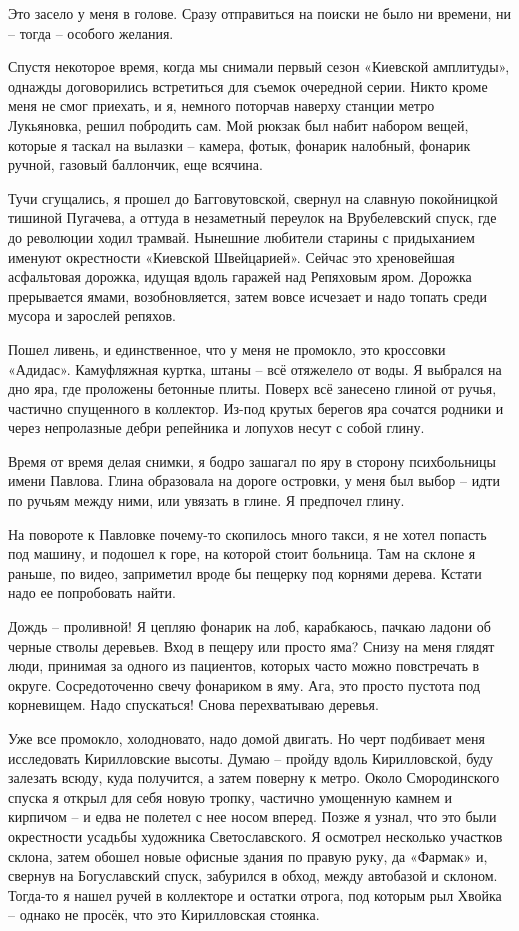Это засело у меня в голове. Сразу отправиться на поиски не было ни времени, ни – тогда – особого желания.

Спустя некоторое время, когда мы снимали первый сезон «Киевской амплитуды», однажды договорились встретиться для съемок очередной серии. Никто кроме меня не смог приехать, и я, немного поторчав наверху станции метро Лукьяновка, решил побродить сам. Мой рюкзак был набит набором вещей, которые я таскал на вылазки – камера, фотык, фонарик налобный, фонарик ручной, газовый баллончик, еще всячина.

Тучи сгущались, я прошел до Багговутовской, свернул на славную покойницкой тишиной Пугачева, а оттуда в незаметный переулок на Врубелевский спуск, где до революции ходил трамвай. Нынешние любители старины с придыханием именуют окрестности «Киевской Швейцарией». Сейчас это хреновейшая асфальтовая дорожка, идущая вдоль гаражей над Репяховым яром. Дорожка прерывается ямами, возобновляется, затем вовсе исчезает и надо топать среди мусора и зарослей репяхов.

Пошел ливень, и единственное, что у меня не промокло, это кроссовки «Адидас». Камуфляжная куртка, штаны – всё отяжелело от воды. Я выбрался на дно яра, где проложены бетонные плиты. Поверх всё занесено глиной от ручья, частично спущенного в коллектор. Из-под крутых берегов яра сочатся родники и через непролазные дебри репейника и лопухов несут с собой глину.

Время от время делая снимки, я бодро зашагал по яру в сторону психбольницы имени Павлова. Глина образовала на дороге островки, у меня был выбор – идти по ручьям между ними, или увязать в глине. Я предпочел глину.

На повороте к Павловке почему-то скопилось много такси, я не хотел попасть под машину, и подошел к горе, на которой стоит больница. Там на склоне я раньше, по видео, заприметил вроде бы пещерку под корнями дерева. Кстати надо ее попробовать найти.

Дождь – проливной! Я цепляю фонарик на лоб, карабкаюсь, пачкаю ладони об черные стволы деревьев. Вход в пещеру или просто яма? Снизу на меня глядят люди, принимая за одного из пациентов, которых часто можно повстречать в округе. Сосредоточенно свечу фонариком в яму. Ага, это просто пустота под корневищем. Надо спускаться! Снова перехватываю деревья.

Уже все промокло, холодновато, надо домой двигать. Но черт подбивает меня исследовать Кирилловские высоты. Думаю – пройду вдоль Кирилловской, буду залезать всюду, куда получится, а затем поверну к метро. Около Смородинского спуска я открыл для себя новую тропку, частично умощенную камнем и кирпичом – и едва не полетел с нее носом вперед. Позже я узнал, что это были окрестности усадьбы художника Светославского. Я осмотрел несколько участков склона, затем обошел новые офисные здания по правую руку, да «Фармак» и, свернув на Богуславский спуск, забурился в обход, между автобазой и склоном. Тогда-то я нашел ручей в коллекторе и остатки отрога, под которым рыл Хвойка – однако не просёк, что это Кирилловская стоянка.

